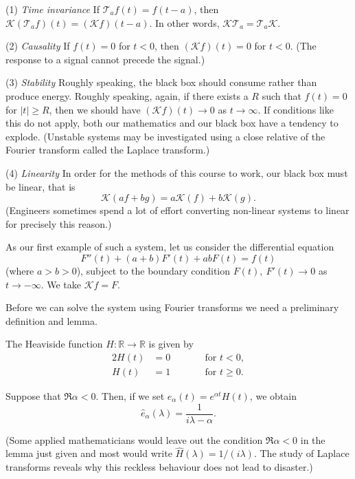 (1) \emph{Time invariance} If ${\mathcal T}_{a}f(t)=f(t-a)$,
then ${\mathcal K}({\mathcal T}_{a}f)(t)=({\mathcal K}f)(t-a)$.
In other words, ${\mathcal K}{\mathcal T}_{a}
={\mathcal T}_{a}{\mathcal K}$.

(2) \emph{Causality} If $f(t)=0$ for $t<0$, then
$({\mathcal K}f)(t)=0$ for $t<0$. (The response
to a signal cannot precede the signal.)

(3) \emph{Stability} Roughly speaking, the black box
should consume rather than produce energy. Roughly
speaking, again, if there exists a $R$ such that
$f(t)=0$ for $|t|\geq R$, then we should have
$({\mathcal K}f)(t)\rightarrow 0$ as $t\rightarrow\infty$.
If conditions like this do not apply, both our mathematics
and our black box have a tendency to explode.
(Unstable systems may be investigated using a close
relative of the Fourier transform called the Laplace transform.)

(4) \emph{Linearity} In order for the methods of this course
to work, our black box must be linear, that is
\[{\mathcal K}(af+bg)=a{\mathcal K}(f)+b{\mathcal K}(g).\]
(Engineers sometimes spend a lot of effort converting
non-linear systems to linear for precisely this reason.)

As our first example of such a system, let us consider
the differential equation
\begin{equation*}
\tag*{$\bigstar$}
F''(t)+(a+b)F'(t)+ab F(t)=f(t)
\end{equation*}
(where $a>b>0$), subject to the boundary condition
$F(t),\ F'(t)\rightarrow 0$ as $t\rightarrow -\infty$.
We take ${\mathcal K}f=F$.

Before we can solve the system using Fourier transforms
we need a preliminary definition and lemma.
\begin{definition} The Heaviside function
$H:{\mathbb R}\rightarrow{\mathbb R}$ is given by
\begin{alignat*}{2}
H(t)&=0&&\qquad\text{for $t<0$},\\
H(t)&=1&&\qquad\text{for $t\geq 0$.}
\end{alignat*}
\end{definition}
\begin{lemma} Suppose that $\Re \alpha<0$. Then, if we set
$e_{\alpha}(t)=e^{\alpha t}H(t)$, we obtain
\[\hat{e}_{\alpha}(\lambda)=\frac{1}{i\lambda-\alpha}.\]
\end{lemma}
(Some applied mathematicians would leave out
the condition $\Re \alpha<0$ in the lemma
just given and most would write $\hat{H}(\lambda)=1/(i\lambda)$.
The study of Laplace transforms reveals why this reckless
behaviour does not lead to disaster.)

